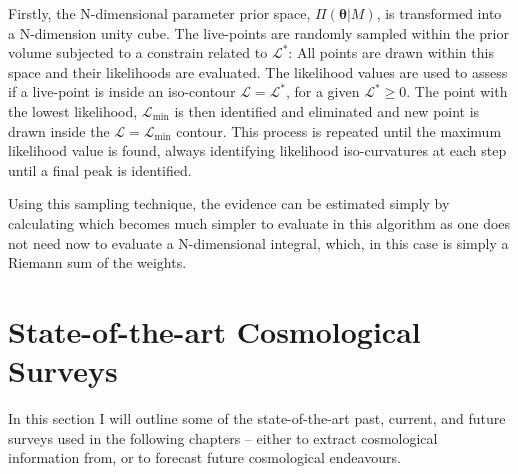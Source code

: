 \qquad Firstly, the N-dimensional parameter prior space, $\Pi(\bm{\theta}|M)$, is transformed into a N-dimension unity cube. The live-points are randomly sampled within the prior volume subjected to a constrain related to $\mathcal{L}^*$:
All points are drawn within this space and their likelihoods are evaluated. The likelihood values are used to assess if a live-point is inside an iso-contour $\mathcal{L} = \mathcal{L}^*$, for a given $\mathcal{L}^*\geq 0$. The point with the lowest likelihood, $\mathcal{L}_{\min}$ is then identified and eliminated and new point is drawn inside the $\mathcal{L} = \mathcal{L}_{\min}$ contour. This process is repeated until the maximum likelihood value is found, always identifying likelihood iso-curvatures at each step until a final peak is identified.

\qquad Using this sampling technique, the evidence can be estimated simply by calculating
which becomes much simpler to evaluate in this algorithm as one does not need now to evaluate a N-dimensional integral, which, in this case is simply a Riemann sum of the weights.

\section{State-of-the-art Cosmological Surveys}\label{sec:intro:probes}
In this section I will outline some of the state-of-the-art past, current, and future surveys used in the following chapters -- either to extract cosmological information from, or to forecast future cosmological endeavours.

